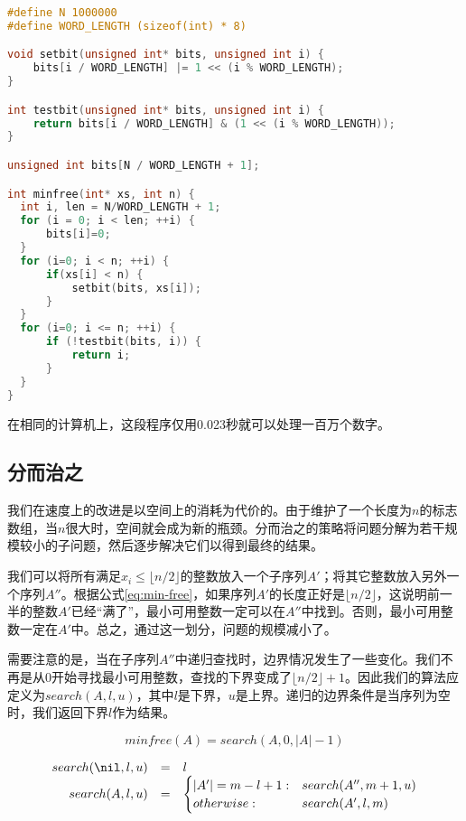 \documentclass[b5paper]{ctexart}
\begin{document}
\begin{lstlisting}[language=C]
#define N 1000000
#define WORD_LENGTH (sizeof(int) * 8)

void setbit(unsigned int* bits, unsigned int i) {
    bits[i / WORD_LENGTH] |= 1 << (i % WORD_LENGTH);
}

int testbit(unsigned int* bits, unsigned int i) {
    return bits[i / WORD_LENGTH] & (1 << (i % WORD_LENGTH));
}

unsigned int bits[N / WORD_LENGTH + 1];

int minfree(int* xs, int n) {
  int i, len = N/WORD_LENGTH + 1;
  for (i = 0; i < len; ++i) {
      bits[i]=0;
  }
  for (i=0; i < n; ++i) {
      if(xs[i] < n) {
          setbit(bits, xs[i]);
      }
  }
  for (i=0; i <= n; ++i) {
      if (!testbit(bits, i)) {
          return i;
      }
  }
}
\end{lstlisting}

在相同的计算机上，这段程序仅用0.023秒就可以处理一百万个数字。

\subsection{分而治之}
我们在速度上的改进是以空间上的消耗为代价的。由于维护了一个长度为$n$的标志数组，当$n$很大时，空间就会成为新的瓶颈。分而治之的策略将问题分解为若干规模较小的子问题，然后逐步解决它们以得到最终的结果。

我们可以将所有满足$x_i \leq \lfloor n/2 \rfloor$的整数放入一个子序列$A'$；将其它整数放入另外一个序列$A''$。根据公式\ref{eq:min-free}，如果序列$A'$的长度正好是$\lfloor n/2 \rfloor$，这说明前一半的整数$A'$已经“满了”，最小可用整数一定可以在$A''$中找到。否则，最小可用整数一定在$A'$中。总之，通过这一划分，问题的规模减小了。

需要注意的是，当在子序列$A''$中递归查找时，边界情况发生了一些变化。我们不再是从0开始寻找最小可用整数，查找的下界变成了$\lfloor n/2 \rfloor + 1$。因此我们的算法应定义为$search(A, l, u)$，其中$l$是下界，$u$是上界。递归的边界条件是当序列为空时，我们返回下界$l$作为结果。

\[
minfree(A) = search(A, 0, |A|-1)
\]

\[
\begin{array}{rcl}
search(\nil, l, u) & = & l \\
search(A, l, u) & = & \begin{cases}
       |A'| = m - l + 1 : & search(A'', m+1, u) \\
       otherwise : & search(A',  l, m) \\
\end{cases}
\end{array}
\]
\end{document}
